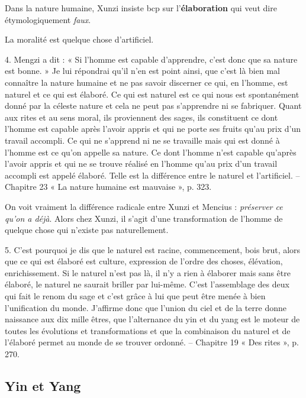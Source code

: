 Dans la nature humaine, Xunzi insiste bcp sur l'\textbf{élaboration} qui veut dire étymologiquement \textit{faux}. 

La moralité est quelque chose d'artificiel.

\begin{singlequote}
    4.	Mengzi a dit : « Si l’homme est capable d’apprendre, c’est donc que sa nature est bonne. » Je lui répondrai qu’il n’en est point ainsi, que c’est là bien mal connaître la nature humaine et ne pas savoir discerner ce qui, en l’homme, est naturel et ce qui est élaboré.
Ce qui est naturel est ce qui nous est spontanément donné par la céleste nature et cela ne peut pas s’apprendre ni se fabriquer. Quant aux rites et au sens moral, ils proviennent des sages, ils constituent ce dont l’homme est capable après l’avoir appris et qui ne porte ses fruits qu’au prix d’un travail accompli. Ce qui ne s’apprend ni ne se travaille mais qui est donné à l’homme est ce qu’on appelle sa nature. Ce dont l’homme n’est capable qu’après l’avoir appris et qui ne se trouve réalisé en l’homme qu’au prix d’un travail accompli est appelé élaboré. Telle est la différence entre le naturel et l’artificiel.
-- Chapitre 23 « La nature humaine est mauvaise », p. 323.


\end{singlequote}


On voit vraiment la différence radicale entre Xunzi et Mencius : \textit{préserver ce qu'on a déjà}. Alors chez Xunzi, il s'agit d'une transformation de l'homme de quelque chose qui n'existe pas naturellement. 


\begin{singlequote}
    5.	C’est pourquoi je dis que le naturel est racine, commencement, bois brut, alors que ce qui est élaboré est culture, expression de l’ordre des choses, élévation, enrichissement. Si le naturel n’est pas là, il n’y a rien à élaborer mais sans être élaboré, le naturel ne saurait briller par lui-même. C’est l’assemblage des deux qui fait le renom du sage et c’est grâce à lui que peut être menée à bien l’unification du monde. J’affirme donc que l’union du ciel et de la terre donne naissance aux dix mille êtres, que l’alternance du yin et du yang est le moteur de toutes les évolutions et transformations et que la combinaison du naturel et de l’élaboré permet au monde de se trouver ordonné.
-- Chapitre 19 « Des rites », p. 270.
\end{singlequote}

\subsection{Yin et Yang}

